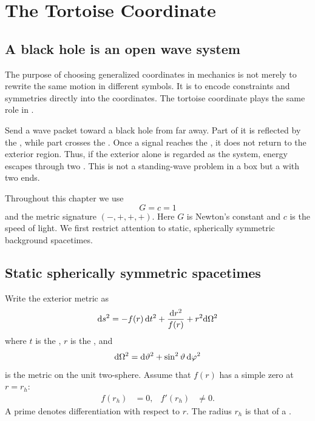 \chapter{The Tortoise Coordinate}
\label{chap:tortoise}

\section{A black hole is an open wave system}

The purpose of choosing generalized coordinates in mechanics is not merely to rewrite the same motion in different symbols. It is to encode constraints and symmetries directly into the coordinates. The tortoise coordinate plays the same role in .

Send a wave packet toward a black hole from far away. Part of it is reflected by the , while part crosses the . Once a signal reaches the , it does not return to the exterior region. Thus, if the exterior alone is regarded as the system, energy escapes through two . This is not a standing-wave problem in a box but a  with two ends.

Throughout this chapter we use 
\begin{equation}
G=c=1
\label{eq:geometrized_units}
\end{equation}
and the metric signature $(-,+,+,+)$. Here $G$ is Newton's constant and $c$ is the speed of light. We first restrict attention to static, spherically symmetric background spacetimes.

\section{Static spherically symmetric spacetimes}

Write the exterior metric as
\begin{equation}
\mathrm{d} s^2
=
-f(r)\,\mathrm{d} t^2
+\frac{\mathrm{d} r^2}{f(r)}
+r^2\mathrm{d}\Omega^2
\label{eq:sss_metric}
\end{equation}
where $t$ is the , $r$ is the , and
\begin{equation}
\mathrm{d}\Omega^2
=
\mathrm{d}\vartheta^2
+\sin^2\vartheta\,\mathrm{d}\varphi^2
\end{equation}
is the metric on the unit two-sphere. Assume that $f(r)$ has a simple zero at $r=r_h$:
\begin{align}
f(r_h)&=0,
&
f'(r_h)&\ne 0.
\label{eq:simple_horizon}
\end{align}
A prime denotes differentiation with respect to $r$. The radius $r_h$ is that of a .

